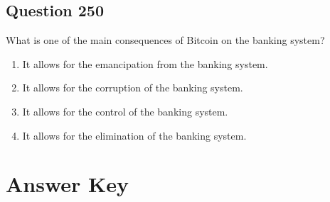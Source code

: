 \documentclass[12pt,a4paper]{article}
\begin{document}
\bigskip


\subsection*{Question 250}
What is one of the main consequences of Bitcoin on the banking system?

\begin{enumerate}[label=\Alph*., leftmargin=*]
\item It allows for the emancipation from the banking system.
\item It allows for the corruption of the banking system.
\item It allows for the control of the banking system.
\item It allows for the elimination of the banking system.
\end{enumerate}

\bigskip


\newpage
\section*{Answer Key}
\end{document}
